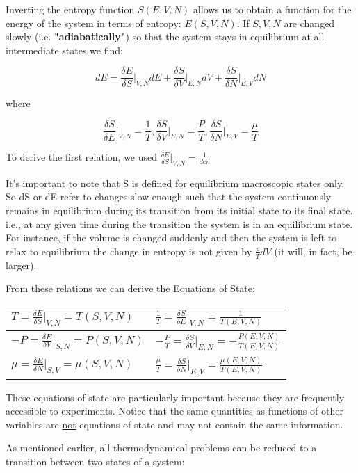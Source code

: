 \documentclass{article}
\newcommand{\thermdif}[4]{\frac{\delta#1}{\delta#2}\vert_{#3,#4}}
\begin{document}
Inverting the entropy function $S(E,V,N)$ allows us to obtain a function for the energy of the system in terms of entropy: $E(S,V,N)$.  If $S,V,N$ are changed slowly (i.e. \textbf{"adiabatically"}) so that the system stays in equilibrium at all intermediate states we find:

$$dE=\thermdif{E}{S}{V}{N}dE+\thermdif{S}{V}{E}{N}dV+\thermdif{S}{N}{E}{V}dN$$

where

$$\thermdif{S}{E}{V}{N}=\frac{1}{T}, \thermdif{S}{V}{E}{N}=\frac{P}{T}, \thermdif{S}{N}{E}{V}=\frac{\mu}{T}$$

To derive the first relation, we used $\thermdif{E}{S}{V}{N}=\frac{1}{den}$


It's important to note that S is defined for equilibrium macroscopic states only.  So dS or dE refer to changes slow enough such that the system continuously remains in equilibrium during its transition from its initial state to its final state.  i.e., at any given time during the transition the system is in an equilibrium state.  For instance, if the volume is changed suddenly and then the system is left to relax to equilibrium the change in entropy is not given by $\frac{p}{T}dV$ (it will, in fact, be larger). 

From these relations we can derive the Equations of State:

\begin{tabu} to 0.8\textwidth { | X[l] | X[r] | }
	\hline
	$T=\thermdif{E}{S}{V}{N}=T(S,V,N)$ & $\frac{1}{T}=\thermdif{S}{E}{V}{N}=\frac{1}{T(E,V,N)}$ \\
	\hline
	$-P=\thermdif{E}{V}{S}{N}=P(S,V,N)$ & $-\frac{P}{T}=\thermdif{S}{V}{E}{N}=-\frac{P(E,V,N)}{T(E,V,N)}$ \\
	\hline
	$\mu=\thermdif{E}{N}{S}{V}=\mu(S,V,N)$ & $\frac{\mu}{T}=\thermdif{S}{N}{E}{V}=\frac{\mu(E,V,N)}{T(E,V,N)}$ \\
	\hline
\end{tabu}

These equations of state are particularly important because they are frequently accessible to experiments.  Notice that the same quantities as functions of other variables are \underline{not} equations of state and may not contain the same information. 

As mentioned earlier, all thermodynamical problems can be reduced to a transition between two states of a system:

\end{document}
